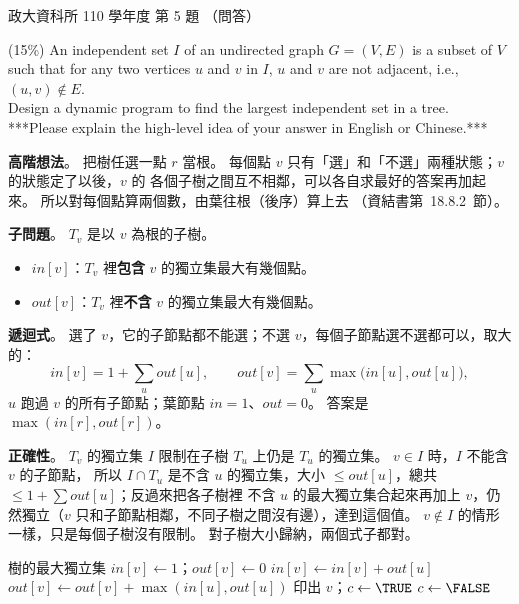 \begin{pastexam}[label={px:nccu-110-dsa-05}]{政大資科所 110 學年度 第 5 題}
（問答）

(15\%) An independent set $I$ of an undirected graph $G=(V,E)$ is a subset of $V$ such that for any
two vertices $u$ and $v$ in $I$, $u$ and $v$ are not adjacent, i.e., $(u,v)\notin E$.\\
Design a dynamic program to find the largest independent set in a tree.\\
***Please explain the high-level idea of your answer in English or Chinese.***
\end{pastexam}

\begin{pastsoln}
\textbf{高階想法}。 把樹任選一點 $r$ 當根。 每個點 $v$ 只有「選」和「不選」兩種狀態；$v$ 的狀態定了以後，$v$ 的
各個子樹之間互不相鄰，可以各自求最好的答案再加起來。 所以對每個點算兩個數，由葉往根（後序）算上去
（資結書第~18.8.2~節）。

\textbf{子問題}。 $T_v$ 是以 $v$ 為根的子樹。
\begin{itemize}
\item $\mathit{in}[v]$：$T_v$ 裡\textbf{包含} $v$ 的獨立集最大有幾個點。
\item $\mathit{out}[v]$：$T_v$ 裡\textbf{不含} $v$ 的獨立集最大有幾個點。
\end{itemize}

\textbf{遞迴式}。 選了 $v$，它的子節點都不能選；不選 $v$，每個子節點選不選都可以，取大的：
\[
\mathit{in}[v] = 1 + \sum_{u} \mathit{out}[u], \qquad
\mathit{out}[v] = \sum_{u} \max\bigl(\mathit{in}[u], \mathit{out}[u]\bigr),
\]
$u$ 跑過 $v$ 的所有子節點；葉節點 $\mathit{in} = 1$、$\mathit{out} = 0$。 答案是 $\max(\mathit{in}[r], \mathit{out}[r])$。

\textbf{正確性}。 $T_v$ 的獨立集 $I$ 限制在子樹 $T_u$ 上仍是 $T_u$ 的獨立集。 $v \in I$ 時，$I$ 不能含 $v$ 的子節點，
所以 $I \cap T_u$ 是不含 $u$ 的獨立集，大小 $\le \mathit{out}[u]$，總共 $\le 1 + \sum \mathit{out}[u]$；反過來把各子樹裡
不含 $u$ 的最大獨立集合起來再加上 $v$，仍然獨立（$v$ 只和子節點相鄰，不同子樹之間沒有邊），達到這個值。
$v \notin I$ 的情形一樣，只是每個子樹沒有限制。 對子樹大小歸納，兩個式子都對。

\begin{pseudo}{樹的最大獨立集}
 
    \State $\mathit{in}[v] \gets 1$；$\mathit{out}[v] \gets 0$
        \State {}
        \State $\mathit{in}[v] \gets \mathit{in}[v] + \mathit{out}[u]$
        \State $\mathit{out}[v] \gets \mathit{out}[v] + \max(\mathit{in}[u], \mathit{out}[u])$
    \EndFor
\EndProcedure
\Statex
{} 
        \State 印出 $v$；$c \gets \TRUE$
    \Else
        \State $c \gets \FALSE$
    \EndIf
        \State {}
    \EndFor
\EndProcedure
\end{pseudo}


\end{pastsoln}
